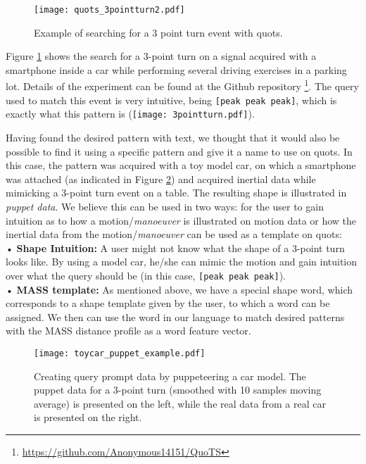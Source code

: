 \begin{figure}
\texttt{[image: quots\_3pointturn2.pdf]}
\caption{Example of searching for a 3 point turn event with \gls{quots}.}
\label{fig:quots_3pointturn}
\end{figure}

Figure \ref{fig:quots_3pointturn} shows the search for a 3-point turn on a signal acquired with a smartphone inside a car while performing several driving exercises in a parking lot. Details of the experiment can be found at the Github repository \footnote{\url{https://github.com/Anonymous14151/QuoTS}}. The query used to match this event is very intuitive, being \texttt{[peak peak peak]}, which is exactly what this pattern is (\texttt{[image: 3pointturn.pdf]}). 
\par
Having found the desired pattern with text, we thought that it would also be possible to find it using a specific pattern and give it a name to use on \gls{quots}. In this case, the pattern was acquired with a toy model car, on which a smartphone was attached (as indicated in Figure \ref{fig:puppeteering}) and acquired inertial data while mimicking a 3-point turn event on a table. The resulting shape is illustrated in \textit{puppet data}. We believe this can be used in two ways: for the user to gain intuition as to how a motion/\textit{manoeuver} is illustrated on motion data or how the inertial data from the motion/\textit{manoeuver} can be used as a template on \gls{quots}: \\
•	\textbf{Shape Intuition:} A user might not know what the shape of a 3-point turn looks like. By using a model car, he/she can mimic the motion and gain intuition over what the query should be (in this case, \texttt{[peak peak peak]}). \\
•	\textbf{MASS template:} As mentioned above, we have a special shape word, which corresponds to a shape template given by the user, to which a word can be assigned. We then can use the word in our language to match desired patterns with the MASS distance profile as a word feature vector.  

\begin{figure}[h]
    \centering
    \texttt{[image: toycar\_puppet\_example.pdf]}
    \caption{Creating query prompt data by puppeteering a car model. The puppet data for a 3-point turn (smoothed with 10 samples moving average) is presented on the left, while the real data from a real car is presented on the right. }
    \label{fig:puppeteering}
\end{figure}

